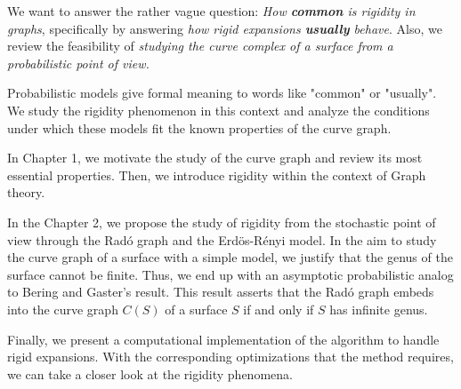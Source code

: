 We want to answer the rather vague question: \textit{How \textbf{common} is rigidity in graphs}, specifically by answering \textit{how rigid expansions \textbf{usually} behave}. Also, we review the feasibility of \textit{studying the curve complex of a surface from a probabilistic point of view.}

Probabilistic models give formal meaning to words like "common" or "usually". We study the rigidity phenomenon in this context and analyze the conditions under which these models fit the known properties of the curve graph.

In Chapter 1, we motivate the study of the curve graph and review its most essential properties. Then, we introduce rigidity within the context of Graph theory.

In the Chapter 2, we propose the study of rigidity from the stochastic point of view through the Radó graph and the Erdös-Rényi model. In the aim to study the curve graph of a surface with a simple model, we justify that the genus of the surface cannot be finite. Thus, we end up with an asymptotic probabilistic analog to Bering and Gaster's result. This result asserts that the Radó graph embeds into the curve graph $C(S)$ of a surface $S$ if and only if $S$ has infinite genus.

Finally, we present a computational implementation of the algorithm to handle rigid expansions. With the corresponding optimizations that the method requires, we can take a closer look at the rigidity phenomena.